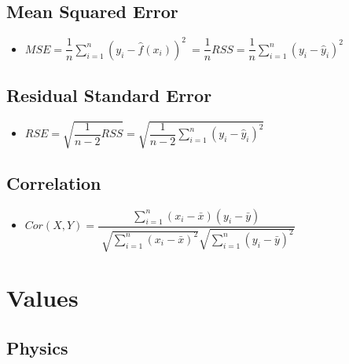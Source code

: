 \documentclass[]{report}
\newcommand \tab[1][1cm]{\hspace*{#1}}
\newcommand{\itemt}{\item \tab}
\begin{document}
	\section{Mean Squared Error}
\begin{itemize}
\itemt \( MSE = \dfrac{1}{n}\sum\limits_{i=1}^n (y_i - \hat{f}(x_i))^2 \ = \dfrac{1}{n}RSS = \dfrac{1}{n}\sum\limits_{i=1}^n (y_i - \hat{y}_i)^2 \)
\end{itemize}


\section{Residual Standard Error}
\begin{itemize}
\itemt \( RSE = \sqrt{\dfrac{1}{n-2}RSS} =\sqrt{\dfrac{1}{n-2}\sum\limits_{i=1}^n (y_i - \hat{y}_i)^2} \)
\end{itemize}



	\section{Correlation}
\begin{itemize}
\itemt \( {Cor}(X,Y) = \dfrac{\sum\limits_{i=1}^n (x_i - \bar{x})(y_i - \bar{y})}{\sqrt[]{\sum\limits_{i=1}^n (x_i - \bar{x})^2}\sqrt{\sum\limits_{i=1}^n (y_i - \bar{y})^2}} \)
\end{itemize}




\appendix




\chapter{Values}



\section{Physics}
\end{document}
